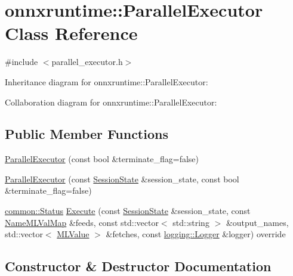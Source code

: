 \hypertarget{classonnxruntime_1_1ParallelExecutor}{}\section{onnxruntime\+:\+:Parallel\+Executor Class Reference}
\label{classonnxruntime_1_1ParallelExecutor}


{\ttfamily \#include $<$parallel\+\_\+executor.\+h$>$}



Inheritance diagram for onnxruntime\+:\+:Parallel\+Executor\+:


Collaboration diagram for onnxruntime\+:\+:Parallel\+Executor\+:
\subsection*{Public Member Functions}
\begin{DoxyCompactItemize}
\item 
\mbox{\hyperlink{classonnxruntime_1_1ParallelExecutor_addd550d090c10a1cbfb08955889cd288}{Parallel\+Executor}} (const bool \&terminate\+\_\+flag=false)
\item 
\mbox{\hyperlink{classonnxruntime_1_1ParallelExecutor_a9416690511d391118f9de19d336e93ed}{Parallel\+Executor}} (const \mbox{\hyperlink{classonnxruntime_1_1SessionState}{Session\+State}} \&session\+\_\+state, const bool \&terminate\+\_\+flag=false)
\item 
\mbox{\hyperlink{classonnxruntime_1_1common_1_1Status}{common\+::\+Status}} \mbox{\hyperlink{classonnxruntime_1_1ParallelExecutor_acdbf9253a5e240edb49737571d321c63}{Execute}} (const \mbox{\hyperlink{classonnxruntime_1_1SessionState}{Session\+State}} \&session\+\_\+state, const \mbox{\hyperlink{namespaceonnxruntime_a48b01f0410ec8d693dbd40d1132bd66c}{Name\+M\+L\+Val\+Map}} \&feeds, const std\+::vector$<$ std\+::string $>$ \&output\+\_\+names, std\+::vector$<$ \mbox{\hyperlink{classonnxruntime_1_1MLValue}{M\+L\+Value}} $>$ \&fetches, const \mbox{\hyperlink{classonnxruntime_1_1logging_1_1Logger}{logging\+::\+Logger}} \&logger) override
\end{DoxyCompactItemize}


\subsection{Constructor \& Destructor Documentation}
\mbox{\label{classonnxruntime_1_1ParallelExecutor_addd550d090c10a1cbfb08955889cd288}} 
